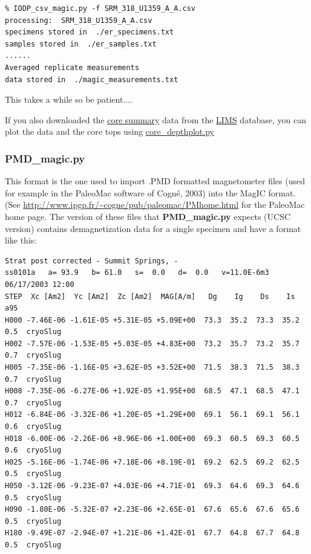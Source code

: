 \documentclass[11pt]{book}
\begin{document}
{{{\begin{verbatim}
% IODP_csv_magic.py -f SRM_318_U1359_A_A.csv 
processing:  SRM_318_U1359_A_A.csv
specimens stored in  ./er_specimens.txt
samples stored in  ./er_samples.txt
......
Averaged replicate measurements
data stored in  ./magic_measurements.txt
\end{verbatim}

This takes a while so be patient....   

If you also downloaded the \href{#IODP_core_summary}{core summary} data from the \href{#LIMS} {LIMS} database, you can plot the data and the core tops using \href{#core_depthplot.py}{core\_depthplot.py} 


\subsubsection{PMD\_magic.py}

This format is the one used to import  .PMD formatted magnetometer files (used for example in the PaleoMac software of Cogn\'e, 2003) \nocite{cogne03} into the MagIC format.  (See \url{http://www.ipgp.fr/~cogne/pub/paleomac/PMhome.html} for the PaleoMac home page.
The version of these files that {\bf PMD\_magic.py} expects (UCSC version) contains demagnetization data for a single specimen and have a format like this:

\begin{verbatim}
Strat post corrected - Summit Springs, -
ss0101a   a= 93.9   b= 61.0   s=  0.0   d=  0.0   v=11.0E-6m3  06/17/2003 12:00
STEP  Xc [Am2]  Yc [Am2]  Zc [Am2]  MAG[A/m]   Dg    Ig    Ds    Is  a95 
H000 -7.46E-06 -1.61E-05 +5.31E-05 +5.09E+00  73.3  35.2  73.3  35.2  0.5  cryoSlug
H002 -7.57E-06 -1.53E-05 +5.03E-05 +4.83E+00  73.2  35.7  73.2  35.7  0.7  cryoSlug
H005 -7.35E-06 -1.16E-05 +3.62E-05 +3.52E+00  71.5  38.3  71.5  38.3  0.7  cryoSlug
H008 -7.35E-06 -6.27E-06 +1.92E-05 +1.95E+00  68.5  47.1  68.5  47.1  0.7  cryoSlug
H012 -6.84E-06 -3.32E-06 +1.20E-05 +1.29E+00  69.1  56.1  69.1  56.1  0.6  cryoSlug
H018 -6.00E-06 -2.26E-06 +8.96E-06 +1.00E+00  69.3  60.5  69.3  60.5  0.6  cryoSlug
H025 -5.16E-06 -1.74E-06 +7.18E-06 +8.19E-01  69.2  62.5  69.2  62.5  0.5  cryoSlug
H050 -3.12E-06 -9.23E-07 +4.03E-06 +4.71E-01  69.3  64.6  69.3  64.6  0.5  cryoSlug
H090 -1.80E-06 -5.32E-07 +2.23E-06 +2.65E-01  67.6  65.6  67.6  65.6  0.5  cryoSlug
H180 -9.49E-07 -2.94E-07 +1.21E-06 +1.42E-01  67.7  64.8  67.7  64.8  0.5  cryoSlug
\end{verbatim}

}}}
\end{document}
